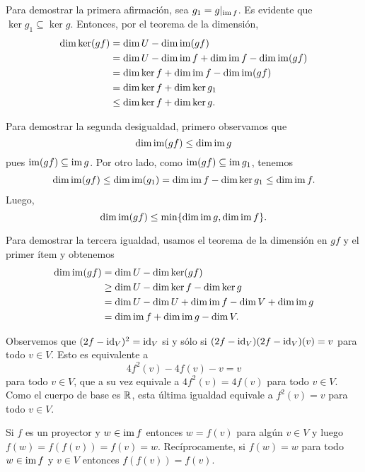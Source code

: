 \begin{solution}
    Para demostrar la primera afirmación, sea $g_1=g|_{\operatorname{im} f}$. Es evidente que
    $\ker g_1\subseteq\ker g$. Entonces, por el teorema de la dimensión, 
    \begin{align*}
        \dim\ker(gf)&=\dim U-\dim\operatorname{im}(gf)\\
        &=\dim U-\dim\operatorname{im} f+\dim\operatorname{im} f-\dim\operatorname{im}(gf)\\
        &=\dim\ker f+\dim\operatorname{im} f-\dim\operatorname{im}(gf)\\
        &=\dim\ker f+\dim\ker g_1\\
        &\leq \dim\ker f+\dim\ker g.
    \end{align*}

    Para demostrar la segunda desigualdad, primero observamos que 
    \[
        \dim\operatorname{im}(gf)\leq\dim\operatorname{im} g
    \]
    pues 
    $\operatorname{im}(gf)\subseteq\operatorname{im} g$. Por otro lado, como
    $\operatorname{im}(gf)\subseteq\operatorname{im} g_1$, tenemos 
    \begin{align*}
        \dim\operatorname{im}(gf)\leq\dim\operatorname{im}(g_1)=\dim\operatorname{im} f-\dim\ker g_1\leq\dim\operatorname{im} f.
    \end{align*}
    Luego,
    \[
    \dim\operatorname{im}(gf)\leq\min\{\dim\operatorname{im} g,\dim\operatorname{im} f\}.
    \]

    Para demostrar la tercera igualdad, usamos el teorema de la dimensión en
    $gf$ y el primer ítem y obtenemos
    \begin{align*}
        \dim\operatorname{im}(gf)&=\dim U-\dim\ker(gf)\\
        &\geq\dim U-\dim\ker f-\dim\ker g\\
        &=\dim U-\dim U+\dim\operatorname{im} f-\dim V+\dim\operatorname{im} g\\
        &=\dim\operatorname{im} f+\dim\operatorname{im} g-\dim V.
    \end{align*}
\end{solution}

\begin{solution}
    Observemos que $(2f-\operatorname{id}_V)^2=\operatorname{id}_V$ si y sólo si
    $(2f-\operatorname{id}_V)(2f-\operatorname{id}_V)(v)=v$ para todo $v\in V$. Esto es equivalente a 
    \[
        4f^2(v)-4f(v)-v=v
    \]
    para todo $v\in V$, que a su vez equivale a $4f^2(v)=4f(v)$ para todo $v\in
    V$. Como el cuerpo de base es $\mathbb{R}$, esta última igualdad equivale a
    $f^2(v)=v$ para todo $v\in V$.
\end{solution}

\begin{solution}
	Si $f$ es un proyector y $w\in \operatorname{im} f$ entonces $w=f(v)$ para algún $v\in V$
	y luego $f(w)=f(f(v))=f(v)=w$.  Recíprocamente, si $f(w)=w$ para todo
	$w\in\operatorname{im} f$ y $v\in V$ entonces $f(f(v))=f(v)$. 
\end{solution}

